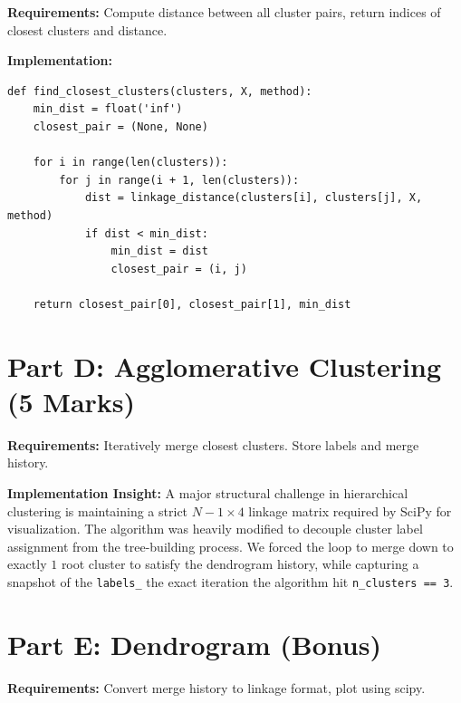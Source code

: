 \documentclass[12pt,a4paper]{article}
\begin{document}
\begin{tcolorbox}
\textbf{Requirements:} Compute distance between all cluster pairs, return indices of closest clusters and distance.
\end{tcolorbox}

\textbf{Implementation:}
\begin{lstlisting}
def find_closest_clusters(clusters, X, method):
    min_dist = float('inf')
    closest_pair = (None, None)

    for i in range(len(clusters)):
        for j in range(i + 1, len(clusters)):
            dist = linkage_distance(clusters[i], clusters[j], X, method)
            if dist < min_dist:
                min_dist = dist
                closest_pair = (i, j)

    return closest_pair[0], closest_pair[1], min_dist
\end{lstlisting}


\section{Part D: Agglomerative Clustering (5 Marks)}

\begin{tcolorbox}
\textbf{Requirements:} Iteratively merge closest clusters. Store labels and merge history.
\end{tcolorbox}

\textbf{Implementation Insight:}
A major structural challenge in hierarchical clustering is maintaining a strict $N-1 \times 4$ linkage matrix required by SciPy for visualization. The algorithm was heavily modified to decouple cluster label assignment from the tree-building process. We forced the loop to merge down to exactly $1$ root cluster to satisfy the dendrogram history, while capturing a snapshot of the \texttt{labels\_} the exact iteration the algorithm hit \texttt{n\_clusters == 3}.


\section{Part E: Dendrogram (Bonus)}

\begin{tcolorbox}
\textbf{Requirements:} Convert merge history to linkage format, plot using scipy.
\end{tcolorbox}
\end{document}
